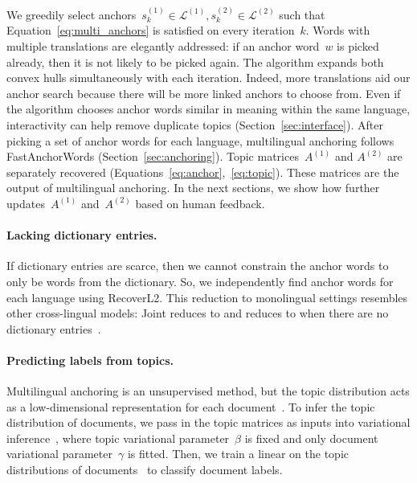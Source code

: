 We greedily select anchors~$s_k^{(1)} \in \mathcal{L}^{(1)}, s_k^{(2)}
\in \mathcal{L}^{(2)}$ such that Equation~\ref{eq:multi_anchors} is satisfied on every iteration~$k$.  Words with multiple translations
are elegantly addressed: if an anchor word~$w$ is picked already, then
it is not likely to be picked again.  The algorithm expands both convex hulls simultaneously with each iteration. Indeed, more translations aid our anchor search because there will be more linked anchors to choose from.  Even if the algorithm chooses anchor words similar in meaning within the same language, interactivity can help remove duplicate topics (Section~\ref{sec:interface}).  After picking a set of anchor words for each language,
multilingual anchoring follows FastAnchorWords (Section~\ref{sec:anchoring}).  Topic matrices~$A^{(1)}$ and
$A^{(2)}$ are separately recovered (Equations~\ref{eq:anchor},~\ref{eq:topic}).  These matrices are the output of
multilingual anchoring.  In the next sections, we show how
\mtanchor further updates~$A^{(1)}$ and~$A^{(2)}$ based on human feedback.


  \paragraph{Lacking dictionary entries.}
  If dictionary entries are scarce, then we cannot
  constrain the anchor words to only be words from the dictionary.
  So, we independently find anchor words for each language using
  RecoverL2.  This reduction to monolingual settings resembles other cross-lingual models: Joint reduces to  and
   reduces to  when there are no dictionary
  entries~\cite{jagarlamudi-2010, hu-2014-ptlda}.

  \paragraph{Predicting labels from topics.}
  \label{sec:predict}
  Multilingual anchoring is an unsupervised method, but the topic distribution acts as a low-dimensional representation for each document~\cite{bengio-2013, xiao-2013, rastogi-2015}.  To infer the topic distribution of documents, we pass in the topic matrices as inputs into variational inference~\citep{blei-2003}, where topic variational parameter~$\beta$ is fixed and only document variational parameter~$\gamma$ is fitted.  Then, we train a linear  on the topic distributions of documents~\citep{fan-2008} to classify document labels.

